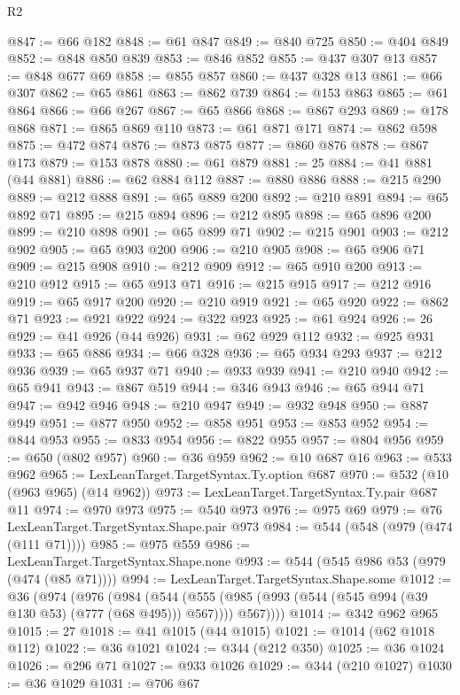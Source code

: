 \begin{lexlean}{R2}
\begin{coremodule}
@847 := @66 @182
@848 := @61 @847
@849 := @840 @725
@850 := @404 @849
@852 := @848 @850 @839
@853 := @846 @852
@855 := @437 @307 @13
@857 := @848 @677 @69
@858 := @855 @857
@860 := @437 @328 @13
@861 := @66 @307
@862 := @65 @861
@863 := @862 @739
@864 := @153 @863
@865 := @61 @864
@866 := @66 @267
@867 := @65 @866
@868 := @867 @293
@869 := @178 @868
@871 := @865 @869 @110
@873 := @61 @871 @171
@874 := @862 @598
@875 := @472 @874
@876 := @873 @875
@877 := @860 @876
@878 := @867 @173
@879 := @153 @878
@880 := @61 @879
@881 := 25
@884 := @41 @881 (@44 @881)
@886 := @62 @884 @112
@887 := @880 @886
@888 := @215 @290
@889 := @212 @888
@891 := @65 @889 @200
@892 := @210 @891
@894 := @65 @892 @71
@895 := @215 @894
@896 := @212 @895
@898 := @65 @896 @200
@899 := @210 @898
@901 := @65 @899 @71
@902 := @215 @901
@903 := @212 @902
@905 := @65 @903 @200
@906 := @210 @905
@908 := @65 @906 @71
@909 := @215 @908
@910 := @212 @909
@912 := @65 @910 @200
@913 := @210 @912
@915 := @65 @913 @71
@916 := @215 @915
@917 := @212 @916
@919 := @65 @917 @200
@920 := @210 @919
@921 := @65 @920
@922 := @862 @71
@923 := @921 @922
@924 := @322 @923
@925 := @61 @924
@926 := 26
@929 := @41 @926 (@44 @926)
@931 := @62 @929 @112
@932 := @925 @931
@933 := @65 @886
@934 := @66 @328
@936 := @65 @934 @293
@937 := @212 @936
@939 := @65 @937 @71
@940 := @933 @939
@941 := @210 @940
@942 := @65 @941
@943 := @867 @519
@944 := @346 @943
@946 := @65 @944 @71
@947 := @942 @946
@948 := @210 @947
@949 := @932 @948
@950 := @887 @949
@951 := @877 @950
@952 := @858 @951
@953 := @853 @952
@954 := @844 @953
@955 := @833 @954
@956 := @822 @955
@957 := @804 @956
@959 := @650 (@802 @957)
@960 := @36 @959
@962 := @10 @687 @16
@963 := @533 @962
@965 := LexLeanTarget.TargetSyntax.Ty.option @687
@970 := @532 (@10 (@963 @965) (@14 @962))
@973 := LexLeanTarget.TargetSyntax.Ty.pair @687 @11
@974 := @970 @973
@975 := @540 @973
@976 := @975 @69
@979 := @76 LexLeanTarget.TargetSyntax.Shape.pair @973
@984 := @544 (@548 (@979 (@474 (@111 @71))))
@985 := @975 @559
@986 := LexLeanTarget.TargetSyntax.Shape.none
@993 := @544 (@545 @986 @53 (@979 (@474 (@85 @71))))
@994 := LexLeanTarget.TargetSyntax.Shape.some
@1012 := @36
    (@974
      (@976
        (@984
          (@544
            (@555 (@985 (@993 (@544 (@545 @994 (@39 @130 @53) (@777 (@68 @495))) @567))))
            @567))))
@1014 := @342 @962 @965
@1015 := 27
@1018 := @41 @1015 (@44 @1015)
@1021 := @1014 (@62 @1018 @112)
@1022 := @36 @1021
@1024 := @344 (@212 @350)
@1025 := @36 @1024
@1026 := @296 @71
@1027 := @933 @1026
@1029 := @344 (@210 @1027)
@1030 := @36 @1029
@1031 := @706 @67

\end{coremodule}
\end{lexlean}
